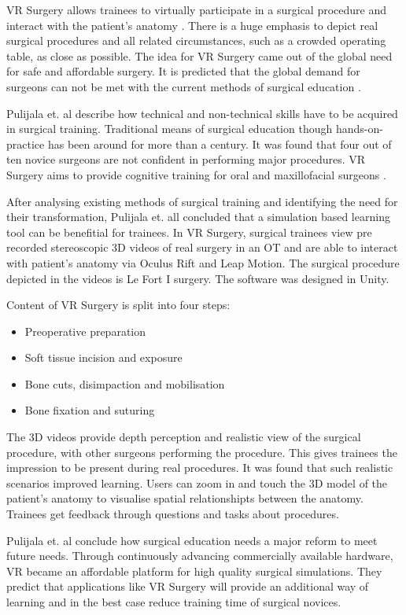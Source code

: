 VR Surgery allows trainees to virtually participate in a surgical procedure and interact with the patient's anatomy \cite{RN6}.
There is a huge emphasis to depict real surgical procedures and all related circumstances, such as a crowded operating table, as close as possible.
The idea for VR Surgery came out of the global need for safe and affordable surgery.
It is predicted that the global demand for surgeons can not be met with the current methods of surgical education \cite{RN68}.

Pulijala et. al describe how technical and non-technical skills have to be acquired in surgical training.
Traditional means of surgical education though hands-on-practice has been around for more than a century.
It was found that four out of ten novice surgeons are not confident in performing major procedures.
VR Surgery aims to provide cognitive training for oral and maxillofacial surgeons \cite{RN68}.

After analysing existing methods of surgical training and identifying the need for their transformation,
Pulijala et. all concluded that a simulation based learning tool can be benefitial for trainees.
In VR Surgery, surgical trainees view pre recorded stereoscopic 3D videos of real surgery in an OT and are able to interact with patient's anatomy via Oculus Rift and Leap Motion.
The surgical procedure depicted in the videos is Le Fort I surgery.
The software was designed in Unity.

Content of VR Surgery is split into four steps:
\begin{itemize}
    \item Preoperative preparation
    \item Soft tissue incision and exposure
    \item Bone cuts, disimpaction and mobilisation
    \item Bone fixation and suturing
\end{itemize}

The 3D videos provide depth perception and realistic view of the surgical procedure, with other surgeons performing the procedure.
This gives trainees the impression to be present during real procedures. It was found that such realistic scenarios improved learning.
Users can zoom in and touch the 3D model of the patient's anatomy to visualise spatial relationshipts between the anatomy.
Trainees get feedback through questions and tasks about procedures.

Pulijala et. al conclude how surgical education needs a major reform to meet future needs.
Through continuously advancing commercially available hardware, VR became an affordable platform for high quality surgical simulations.
They predict that applications like VR Surgery will provide an additional way of learning and in the best case reduce training time of surgical novices.

